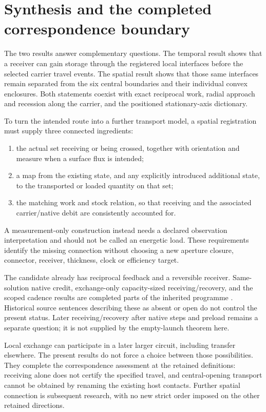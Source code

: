 \section{Synthesis and the completed correspondence boundary}\label{sec:synthesis}
The two results answer complementary questions. The temporal result shows that a receiver can gain storage through the registered local interfaces before the selected carrier travel events. The spatial result shows that those same interfaces remain separated from the six central boundaries and their individual convex enclosures. Both statements coexist with exact reciprocal work, radial approach and recession along the carrier, and the positioned stationary-axis dictionary.

To turn the intended route into a further transport model, a spatial registration must supply three connected ingredients:
\begin{enumerate}
\item the actual set receiving or being crossed, together with orientation and measure when a surface flux is intended;
\item a map from the existing state, and any explicitly introduced additional state, to the transported or loaded quantity on that set;
\item the matching work and stock relation, so that receiving and the associated carrier/native debit are consistently accounted for.
\end{enumerate}
A measurement-only construction instead needs a declared observation interpretation and should not be called an energetic load. These requirements identify the missing connection without choosing a new aperture closure, connector, receiver, thickness, clock or efficiency target.

The candidate already has reciprocal feedback and a reversible receiver. Same-solution native credit, exchange-only capacity-sized receiving/recovery, and the scoped cadence results are completed parts of the inherited programme \cite{RX,RR,F}. Historical source sentences describing these as absent or open do not control the present status. Later receiving/recovery after native steps and preload remains a separate question; it is not supplied by the empty-launch theorem here.

Local exchange can participate in a later larger circuit, including transfer elsewhere. The present results do not force a choice between those possibilities. They complete the correspondence assessment at the retained definitions: receiving alone does not certify the specified travel, and central-opening transport cannot be obtained by renaming the existing host contacts. Further spatial connection is subsequent research, with no new strict order imposed on the other retained directions.

